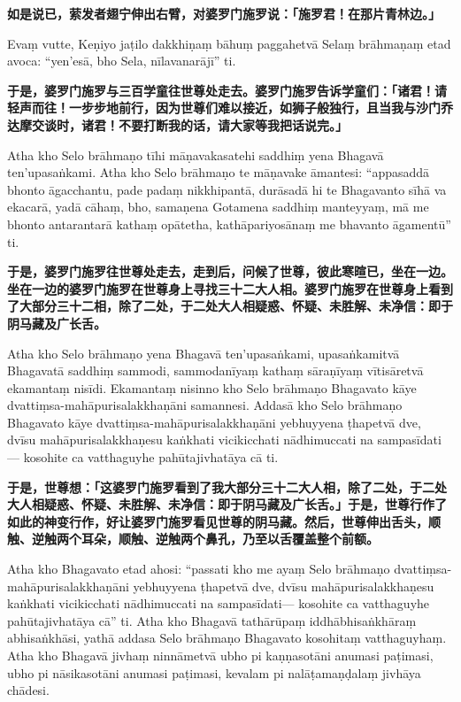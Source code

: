 \textbf{如是说已，萦发者翅宁伸出右臂，对婆罗门施罗说：「施罗君！在那片青林边。」}

Evaṃ vutte, Keṇiyo jaṭilo dakkhiṇaṃ bāhuṃ paggahetvā Selaṃ brāhmaṇaṃ etad avoca: “yen’esā, bho Sela, nīlavanarājī” ti.

\textbf{于是，婆罗门施罗与三百学童往世尊处走去。婆罗门施罗告诉学童们：「诸君！请轻声而往！一步步地前行，因为世尊们难以接近，如狮子般独行，且当我与沙门乔达摩交谈时，诸君！不要打断我的话，请大家等我把话说完。」}

Atha kho Selo brāhmaṇo tīhi māṇavakasatehi saddhiṃ yena Bhagavā ten’upasaṅkami. Atha kho Selo brāhmaṇo te māṇavake āmantesi: “appasaddā bhonto āgacchantu, pade padaṃ nikkhipantā, durāsadā hi te Bhagavanto sīhā va ekacarā, yadā cāhaṃ, bho, samaṇena Gotamena saddhiṃ manteyyaṃ, mā me bhonto antarantarā kathaṃ opātetha, kathāpariyosānaṃ me bhavanto āgamentū” ti.

\textbf{于是，婆罗门施罗往世尊处走去，走到后，问候了世尊，彼此寒暄已，坐在一边。坐在一边的婆罗门施罗在世尊身上寻找三十二大人相。婆罗门施罗在世尊身上看到了大部分三十二相，除了二处，于二处大人相疑惑、怀疑、未胜解、未净信：即于阴马藏及广长舌。}

Atha kho Selo brāhmaṇo yena Bhagavā ten’upasaṅkami, upasaṅkamitvā Bhagavatā saddhiṃ sammodi, sammodanīyaṃ kathaṃ sāraṇīyaṃ vītisāretvā ekamantaṃ nisīdi. Ekamantaṃ nisinno kho Selo brāhmaṇo Bhagavato kāye dvattiṃsa-mahāpurisalakkhaṇāni samannesi. Addasā kho Selo brāhmaṇo Bhagavato kāye dvattiṃsa-mahāpurisalakkhaṇāni yebhuyyena ṭhapetvā dve, dvīsu mahāpurisalakkhaṇesu kaṅkhati vicikicchati nādhimuccati na sampasīdati— kosohite ca vatthaguyhe pahūtajivhatāya cā ti.

\textbf{于是，世尊想：「这婆罗门施罗看到了我大部分三十二大人相，除了二处，于二处大人相疑惑、怀疑、未胜解、未净信：即于阴马藏及广长舌。」于是，世尊行作了如此的神变行作，好让婆罗门施罗看见世尊的阴马藏。然后，世尊伸出舌头，顺触、逆触两个耳朵，顺触、逆触两个鼻孔，乃至以舌覆盖整个前额。}

Atha kho Bhagavato etad ahosi: “passati kho me ayaṃ Selo brāhmaṇo dvattiṃsa-mahāpurisalakkhaṇāni yebhuyyena ṭhapetvā dve, dvīsu mahāpurisalakkhaṇesu kaṅkhati vicikicchati nādhimuccati na sampasīdati— kosohite ca vatthaguyhe pahūtajivhatāya cā” ti. Atha kho Bhagavā tathārūpaṃ iddhābhisaṅkhāraṃ abhisaṅkhāsi, yathā addasa Selo brāhmaṇo Bhagavato kosohitaṃ vatthaguyhaṃ. Atha kho Bhagavā jivhaṃ ninnāmetvā ubho pi kaṇṇasotāni anumasi paṭimasi, ubho pi nāsikasotāni anumasi paṭimasi, kevalam pi nalāṭamaṇḍalaṃ jivhāya chādesi.

